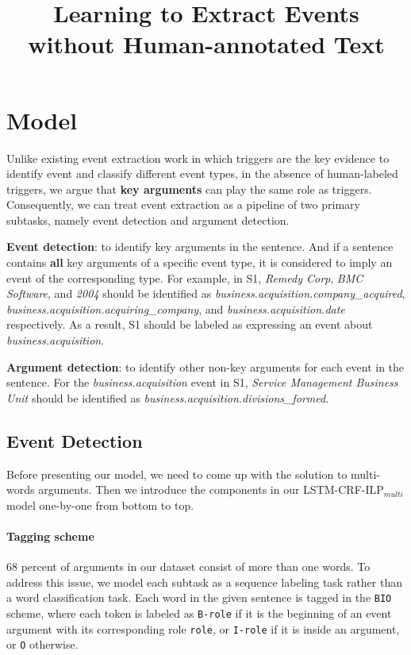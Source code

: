 \documentclass{article}
\title{Learning to Extract Events without Human-annotated Text}
\begin{document}
\maketitle







\section{Model}
Unlike existing event extraction work in which triggers are the key evidence to identify event and classify different event types, in the absence of human-labeled triggers, we argue that \textbf{key arguments} can play the same role as triggers. Consequently, we can treat event extraction as a pipeline of two primary subtasks, namely event detection and argument detection.

\noindent \textbf{Event detection}: to identify key arguments in the sentence. And if a sentence contains \textbf{all} key arguments of a specific event type, it is considered to imply an event of the corresponding type. For example, in S1, \emph{Remedy Corp}, \emph{BMC Software}, and \emph{2004} should be identified as \emph{business.acquisition.company\_acquired}, \emph{business.acquisition.acquiring\_company}, and \emph{business.acquisition.date} respectively. As a result, S1 should be labeled as expressing an event about \emph{business.acquisition}.

\noindent \textbf{Argument detection}: to identify other non-key arguments for each event in the sentence. For the \emph{business.acquisition} event in S1, \emph{Service Management Business Unit} should be identified as \emph{business.acquisition.divisions\_formed}.

\subsection{Event Detection \label{evede}}
Before presenting our model, we need to come up with the solution to multi-words arguments. Then we introduce the components in our LSTM-CRF-ILP$_{multi}$ model one-by-one from bottom to top.

\paragraph{Tagging scheme}
68 percent of arguments in our dataset consist of more than one words. To address this issue, we model each subtask as a sequence labeling task rather than a word classification task. Each word in the given sentence is tagged in the \texttt{BIO} scheme, where each token is labeled as \texttt{B-role} if it is the beginning of an event argument with its corresponding role \texttt{role}, or \texttt{I-role} if it is inside an argument, or \texttt{O} otherwise. 
\end{document}
